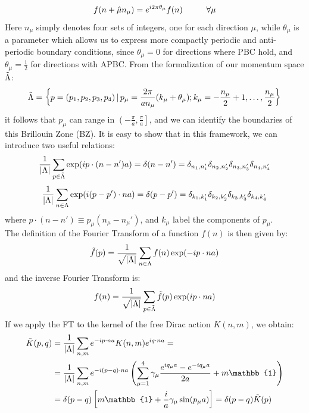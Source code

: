 \begin{equation}
    f(n + \hat{\mu}n_\mu) = e^{i2\pi \theta_\mu} f(n) \hspace{10mm} \forall \mu
\end{equation}
Here $n_\mu$ simply denotes four sets of integers, one for each direction $\mu$, while $\theta_\mu$ is a parameter which allows us to express more compactly periodic and anti-periodic boundary conditions, since $\theta_\mu = 0$ for directions where PBC hold, and $\theta_\mu = \frac{1}{2}$ for directions with APBC. From the formalization of our momentum space $\Tilde{\Lambda}$:
\begin{equation}
    \Tilde{\Lambda} = \biggl\{ p = (p_1, p_2, p_3, p_4) \, | \, p_\mu = \frac{2\pi}{a n_\mu}(k_\mu + \theta_\mu); k_\mu = - \frac{n_\mu}{2} + 1, \dots, \frac{n_\mu}{2} \biggr\}
\end{equation}
it follows that $p_\mu$ can range in $\left(-\frac{\pi}{a}, \frac{\pi}{a} \right]$, and we can identify the boundaries of this Brillouin Zone (BZ). It is easy to show that in this framework, we can introduce two useful relations:
\begin{equation}
    \frac{1}{\abs{\Lambda}} \sum_{p \in \Tilde{\Lambda}} \exp(ip \cdot (n - n')a) = \delta(n - n') = \delta_{n_1, n_1'}\delta_{n_2, n_2'}\delta_{n_3, n_3'}\delta_{n_4, n_4'}
\end{equation}
\begin{equation}
    \frac{1}{\abs{\Lambda}} \sum_{n \in \Lambda} \exp(i(p - p') \cdot na) = \delta(p - p') = \delta_{k_1, k_1'}\delta_{k_2, k_2'}\delta_{k_3, k_3'}\delta_{k_4, k_4'}
\end{equation}
where $p \cdot (n - n') \equiv p_\mu (n_\mu - n_\mu')$, and $k_\mu$ label the components of $p_\mu$.
\\ The definition of the Fourier Transform of a function $f(n)$ is then given by:
\begin{equation}
    \Tilde{f}(p) = \frac{1}{\sqrt{\abs{\Lambda}}} \sum_{n \in \Lambda} f(n) \exp(-ip\cdot n a)
\end{equation}
and the inverse Fourier Transform is:
\begin{equation}
    f(n) = \frac{1}{\sqrt{\abs{\Lambda}}} \sum_{p \in \Tilde{\Lambda}} \Tilde{f}(p) \exp(i p \cdot na)
\end{equation}
If we apply the FT to the kernel of the free Dirac action $K(n, m)$, we obtain:
\begin{equation}
    \begin{split}
        \Tilde{K}(p, q) & = \frac{1}{\abs{\Lambda}}\sum_{n, m} e^{-ip\cdot na} K(n,m) e^{iq \cdot na} = \\
                        & = \frac{1}{\abs{\Lambda}}\sum_{n, m} e^{-i(p-q)\cdot na} \left( \sum_{\mu = 1}^4 \gamma_\mu \frac{e^{iq_\mu a} - e^{-i q_\mu a}}{2a} + m\mathbb{1} \right) \\
                        & = \delta(p - q) \left[ m \mathbb{1} + \frac{i}{a} \gamma_\mu \sin(p_\mu a) \right] = \delta(p - q) \Tilde{K}(p)
    \end{split}
\end{equation}
